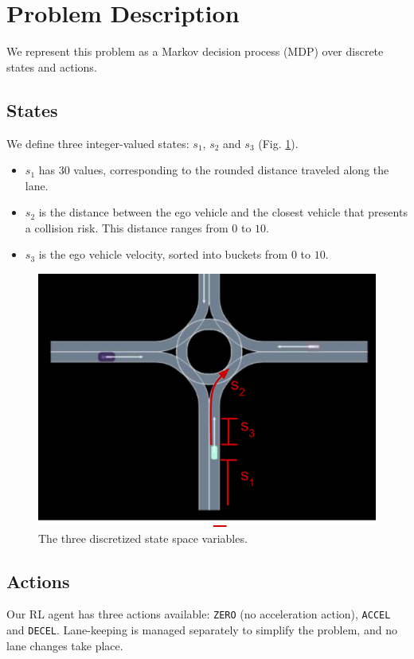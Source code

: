 \documentclass[conference]{IEEEtran}
\begin{document}
\section*{Problem Description}
We represent this problem as a Markov decision process (MDP) over discrete states and actions. 

\subsection*{States} We define three integer-valued states: $s_1$, $s_2$ and $s_3$ (Fig. \ref{fig:statespace}).
\begin{itemize}
	\item
$s_1$ has 30 values, corresponding to the rounded distance traveled along the lane.
 \item
$s_2$ is the distance between the ego vehicle and the closest vehicle that presents a collision risk. This distance ranges from $0$ to $10$. %
\item
$s_3$ is the ego vehicle velocity, sorted into buckets from $0$ to $10$.
\end{itemize}

\begin{figure}[h!]
	\centering
	\includegraphics[width=0.8\linewidth]{figures/statespace.pdf}
	\caption{The three discretized state space variables.}
	\label{fig:statespace}
\end{figure}

\subsection*{Actions} Our RL agent has three actions available: \verb|ZERO| (no acceleration action), \verb|ACCEL| and \verb|DECEL|. Lane-keeping is managed separately to simplify the problem, and no lane changes take place.
\end{document}
